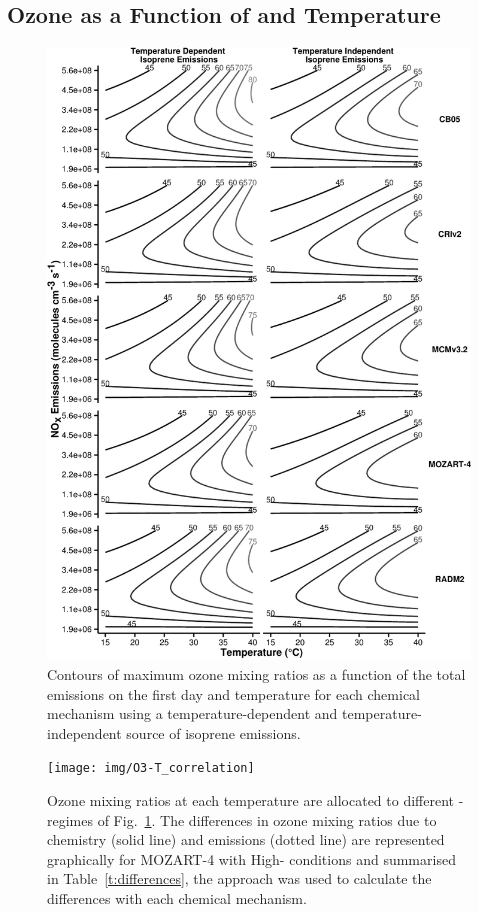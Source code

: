 \subsection[Ozone as a Function of NOx and Temperature]{Ozone as a Function of  and Temperature} \label{ss:r_contours}

\begin{figure}%
    \centering%
    \caption{Contours of maximum ozone mixing ratios as a function of the total  emissions on the first day and temperature for each chemical mechanism using a temperature-dependent and temperature-independent source of isoprene emissions.}
    \label{f:ozone_contours}%
    \includegraphics[width=\textwidth]{img/O3_comparison}%
\end{figure}

\begin{figure}[t]%
    \centering%
    \caption{Ozone mixing ratios at each temperature are allocated to different -regimes of Fig.~\ref{f:ozone_contours}. The differences in ozone mixing ratios due to chemistry (solid line) and emissions (dotted line) are represented graphically for MOZART-4 with High- conditions and summarised in Table~\ref{t:differences}, the approach was used to calculate the differences with each chemical mechanism.}%
    \label{f:O3-T}%
    \texttt{[image: img/O3-T\_correlation]}%
\end{figure}

